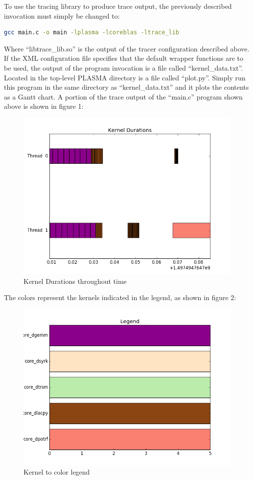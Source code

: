 \documentclass{article}
\begin{document}
To use the tracing library to produce trace output, the previously described invocation must simply be changed to:
\begin{lstlisting}[language=bash]
gcc main.c -o main -lplasma -lcoreblas -ltrace_lib
\end{lstlisting}
Where ``libtrace\_lib.so'' is the output of the tracer configuration described above. If the XML configuration file specifies that the default wrapper functions are to be used, the output of the program invocation is a file called ``kernel\_data.txt''. Located in the top-level PLASMA directory is a file called ``plot.py''. Simply run this program in the same directory as ``kernel\_data.txt'' and it plots the contents as a Gantt chart. A portion of the trace output of the ``main.c'' program shown above is shown in figure 1:
\begin{figure}[H]
\caption{Kernel Durations throughout time}
\begin{center}
\includegraphics[scale=0.75]{figure_1.png}
\end{center}
\end{figure}
The colors represent the kernels indicated in the legend, as shown in figure 2:
\begin{figure}[H]
\caption{Kernel to color legend}
\begin{center}
\includegraphics[scale=0.75]{figure_2.png}
\end{center}
\end{figure}
\end{document}
